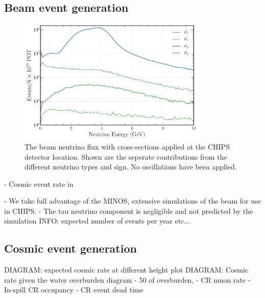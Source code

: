 \subsection{Beam event generation} %
\label{sec:chips_monte_carlo_beam} %

\begin{figure} %
    \includegraphics[width=0.8\textwidth]{diagrams/4-chips/flux.pdf}
    \caption[\numi neutrino flux at CHIPS.]
    {The \numi beam neutrino flux with cross-sections applied at the CHIPS detector location. Shown
        are the seperate contributions from the different neutrino types and sign. No oscillations
        have been applied.}
    \label{fig:flux}
\end{figure}

- Cosmic event rate in \cite{son2013}

- We take full advantage of the MINOS, \nova extensive simulations of the \numi beam for use in
CHIPS.
- The tau neutrino component is negligible and not predicted by the simulation
INFO: expected number of events per year etc...

\subsection{Cosmic event generation} %
\label{sec:chips_monte_carlo_cosmic} %

DIAGRAM: expected cosmic rate at different height plot
DIAGRAM: Cosmic rate given the water overburden diagram
- \unit{50}{} of overburden,
- CR muon rate
- In-spill CR occupancy
- CR event dead time

